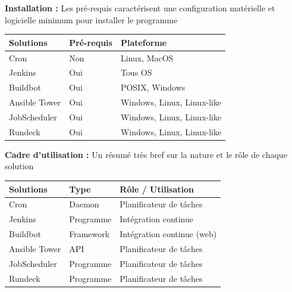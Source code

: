 \documentclass[12pt]{article}
\begin{document}
\textbf{Installation :}
Les pré-requis caractérisent une configuration matérielle et logicielle minimum pour installer le programme
\vspace{0.5cm}
\\
\begin{center}
\begin{tabular}{|l|l|l|}
\hline
Solutions     & Pré-requis & Plateforme                 \\ \hline
Cron          & Non        & Linux, MacOS               \\ \hline
Jenkins       & Oui        & Tous OS                    \\ \hline
Buildbot      & Oui        & POSIX, Windows             \\ \hline
Ansible Tower & Oui        & Windows, Linux, Linux-like \\ \hline
JobScheduler  & Oui        & Windows, Linux, Linux-like \\ \hline
Rundeck       & Oui        & Windows, Linux, Linux-like \\ \hline
\end{tabular}
\end{center}

\vspace{0.5cm}

\textbf{Cadre d'utilisation :}
Un résumé très bref sur la nature et le rôle de chaque solution
\vspace{0.5cm}
\\
\begin{center}
\begin{tabular}{|l|l|l|}
\hline
Solutions     & Type      & Rôle / Utilisation         \\ \hline
Cron          & Daemon    & Planificateur de tâches    \\ \hline
Jenkins       & Programme & Intégration continue       \\ \hline
Buildbot      & Framework & Intégration continue (web) \\ \hline
Ansible Tower & API       & Planificateur de tâches    \\ \hline
JobScheduler  & Programme & Planificateur de tâches    \\ \hline
Rundeck       & Programme & Planificateur de tâches    \\ \hline
\end{tabular}
\end{center}

\vspace{0.5cm}
\end{document}
